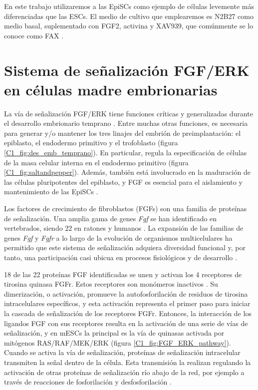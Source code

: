 \documentclass[./main.tex]{subfiles}
\begin{document}
En este trabajo utilizaremos a las EpiSCs como ejemplo de células levemente más diferenciadas que las ESCs. El medio de cultivo que emplearemos es N2B27 como medio basal, suplementado con FGF2, activina y XAV939, que comúnmente se lo conoce como FAX \cite{Brons2007}.



\section{Sistema de señalización FGF/ERK en células madre embrionarias}
\label{C1_sec:FGF_ERK}


La vía de señalización FGF/ERK tiene funciones críticas y generalizadas durante el desarrollo embrionario temprano \cite{Kang2013,Nichols2009,Yamanaka2010,Krawchuk2013,Kang2017,Molotkov2017,Nichols2009,Morgani2013}. Entre muchas otras funciones, es necesaria para generar y/o mantener los tres linajes del embrión de preimplantación: el epiblasto, el endodermo primitivo y el trofoblasto (figura \ref{C1_fig:des_emb_temprano}). En particular, regula la especificación de células de la masa celular interna en el endodermo primitivo (figura \ref{C1_fig:saltandpepper}). Además, también está involucrado en la maduración de las células pluripotentes del epiblasto, y FGF es esencial para el aislamiento y mantenimiento de las EpiSCs \cite{Brons2007,Tesar2007}. 


Los factores de crecimiento de fibroblastos (FGFs) son una familia de proteínas de señalización. Una amplia gama de genes \textit{Fgf} se han identificado en vertebrados, siendo 22 en ratones y humanos \cite{Thisse2005}. La expansión de las familias de genes \textit{Fgf} y \textit{Fgfr} a lo largo de la evolución de organismos multicelulares ha permitido que este sistema de señalización adquiera diversidad funcional y, por tanto, una participación casi ubicua en procesos fisiológicos y de desarrollo \cite{Itoh2004,Powers2000,Goldfarb1996,Coumoul2003}. 


18 de las 22 proteínas FGF identificadas se unen y activan los 4 receptores de tirosina quinasa FGFr. Estos receptores son monómeros inactivos \cite{Schlessinger2000}. Su dimerización, o activación, promueve la autofosforilación de residuos de tirosina intracelulares específicos, y esta activación representa el primer paso para iniciar la cascada de señalización de los receptores FGFr. Entonces, la interacción de los ligandos FGF con sus receptores resulta en la activación de una serie de vías de señalización, y en mESCs la principal es la vía de quinasas activada por mitógenos RAS/RAF/MEK/ERK (figura \ref{C1_fig:FGF_ERK_pathway}). Cuando se activa la vía de señalización, proteínas de señalización intracelular transmiten la señal dentro de la célula. Esta transmisión la realizan regulando la activación de otras proteínas de señalización río abajo de la red, por ejemplo a través de reacciones de fosforilación y desfosforilación \cite{Johnson1996}. 
\end{document}
